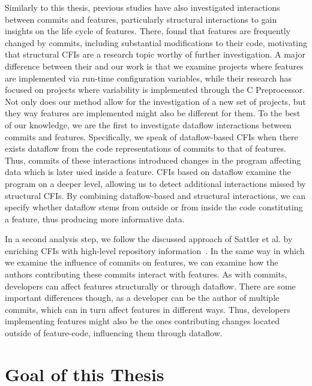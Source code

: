 Similarly to this thesis, previous studies have also investigated interactions between commits and features, particularly structural interactions to gain insights on the life cycle of features. 
There, \citet{michelon2021lifecycle} found that features are frequently changed by commits, including substantial modifications to their code, motivating that structural CFIs are a research topic worthy of further investigation.
A major difference between their and our work is that we examine projects where features are implemented via run-time configuration variables, while their research has focused on projects where variability is implemented through the C Preprocessor.
Not only does our method allow for the investigation of a new set of projects, but they way features are implemented might also be different for them.
To the best of our knowledge, we are the first to investigate dataflow interactions between commits and features.
Specifically, we speak of dataflow-based CFIs when there exists dataflow from the code representations of commits to that of features.
Thus, commits of these interactions introduced changes in the program affecting data which is later used inside a feature.
CFIs based on dataflow examine the program on a deeper level, allowing us to detect additional interactions missed by structural CFIs.
By combining dataflow-based and structural interactions, we can specify whether dataflow stems from outside or from inside the code constituting a feature, thus producing more informative data.

In a second analysis step, we follow the discussed approach of Sattler et al. by enriching CFIs with high-level repository information~\cite{sattler2023seal}.
In the same way in which we examine the influence of commits on features, we can examine how the authors contributing these commits interact with features.
As with commits, developers can affect features structurally or through dataflow.
There are some important differences though, as a developer can be the author of multiple commits, which can in turn affect features in different ways.
Thus, developers implementing features might also be the ones contributing changes located outside of feature-code, influencing them through dataflow.

\section{Goal of this Thesis}

